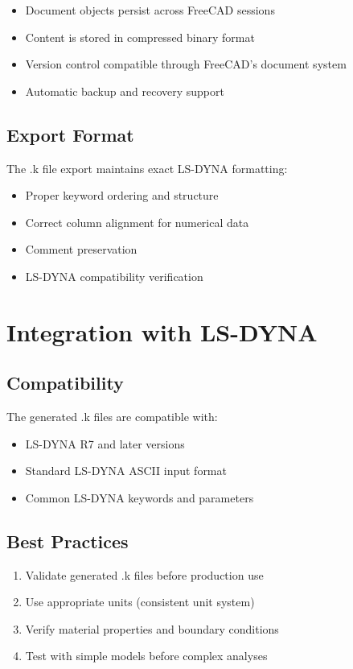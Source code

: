 \documentclass[12pt,a4paper]{article}
\begin{document}
\begin{itemize}
    \item Document objects persist across FreeCAD sessions
    \item Content is stored in compressed binary format
    \item Version control compatible through FreeCAD's document system
    \item Automatic backup and recovery support
\end{itemize}

\subsection{Export Format}
The .k file export maintains exact LS-DYNA formatting:

\begin{itemize}
    \item Proper keyword ordering and structure
    \item Correct column alignment for numerical data
    \item Comment preservation
    \item LS-DYNA compatibility verification
\end{itemize}

\section{Integration with LS-DYNA}

\subsection{Compatibility}
The generated .k files are compatible with:
\begin{itemize}
    \item LS-DYNA R7 and later versions
    \item Standard LS-DYNA ASCII input format
    \item Common LS-DYNA keywords and parameters
\end{itemize}

\subsection{Best Practices}
\begin{enumerate}
    \item Validate generated .k files before production use
    \item Use appropriate units (consistent unit system)
    \item Verify material properties and boundary conditions
    \item Test with simple models before complex analyses
\end{enumerate}
\end{document}
